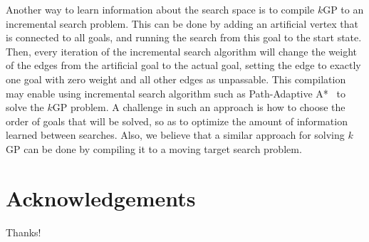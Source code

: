 \documentclass{aicom2e}
\newcommand{\kgs}{$k$GP}
\begin{document}
Another way to learn information about the search space is to compile \kgs{} to an incremental search problem. This can be done by adding an artificial vertex that is connected to all goals, and running the search from this goal to the start state. Then, every iteration of the incremental search algorithm will change the weight of the edges from the artificial goal to the actual goal, setting the edge to exactly one goal with zero weight and all other edges as unpassable. This compilation may enable using incremental search algorithm such as Path-Adaptive A*~\cite{hernandez2015reusing} to solve the \kgs{} problem. 
A challenge in such an approach is how to choose the order of goals that will be solved, so as to optimize the amount of information learned between searches. 
Also, we believe that a similar approach for solving \kgs{} can be done by compiling it to a moving target search problem. 






\section*{Acknowledgements}
Thanks!



\end{document}
